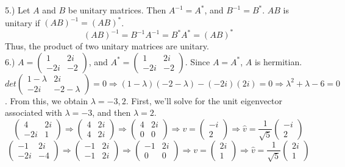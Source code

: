 \documentclass[12pt]{article}
\begin{document}
5.) Let $A$ and $B$ be unitary matrices. Then $A^{-1} = A^*$, and $B^{-1} = B^*$. $AB$ is unitary if $(AB)^{-1} = (AB)^*$.
$$(AB)^{-1} = B^{-1}A^{-1} = B^*A^* = (AB)^{*}$$
Thus, the product of two unitary matrices are unitary.\\

6.) $A = \begin{pmatrix} 1 & 2i \\ -2i & -2 \end{pmatrix}$, and $A^{*} = \begin{pmatrix} 1 & 2i \\ -2i & -2\end{pmatrix}$. Since $A = A^*$, $A$ is hermitian. $det \begin{pmatrix} 1 - \lambda & 2i\\ -2i & -2-\lambda \end{pmatrix} = 0 \Rightarrow (1 - \lambda)(-2 - \lambda) - (-2i)(2i) = 0 \Rightarrow \lambda^2 + \lambda - 6 = 0$.
From this, we obtain $\lambda = -3, 2$. First, we'll solve for the unit eigenvector associated with $\lambda = -3$, and then $\lambda = 2$.
$$\begin{pmatrix} 4 & 2i\\ -2i & 1 \end{pmatrix} \Rightarrow \begin{pmatrix} 4 & 2i\\ 4 & 2i \end{pmatrix} \Rightarrow \begin{pmatrix} 4 & 2i \\ 0 & 0 \end{pmatrix} \Rightarrow v = \begin{pmatrix} -i \\ 2 \end{pmatrix} \Rightarrow \hat{v} = \frac{1}{\sqrt{5}} \begin{pmatrix} -i \\ 2\end{pmatrix}$$
$$\begin{pmatrix} -1 & 2i\\ -2i & -4 \end{pmatrix} \Rightarrow \begin{pmatrix} -1 & 2i\\ -1 & 2i \end{pmatrix} \Rightarrow \begin{pmatrix} -1 & 2i \\ 0 & 0 \end{pmatrix} \Rightarrow v = \begin{pmatrix} 2i \\ 1 \end{pmatrix} \Rightarrow \hat{v} = \frac{1}{\sqrt{5}} \begin{pmatrix} 2i \\ 1\end{pmatrix}$$
\end{document}
